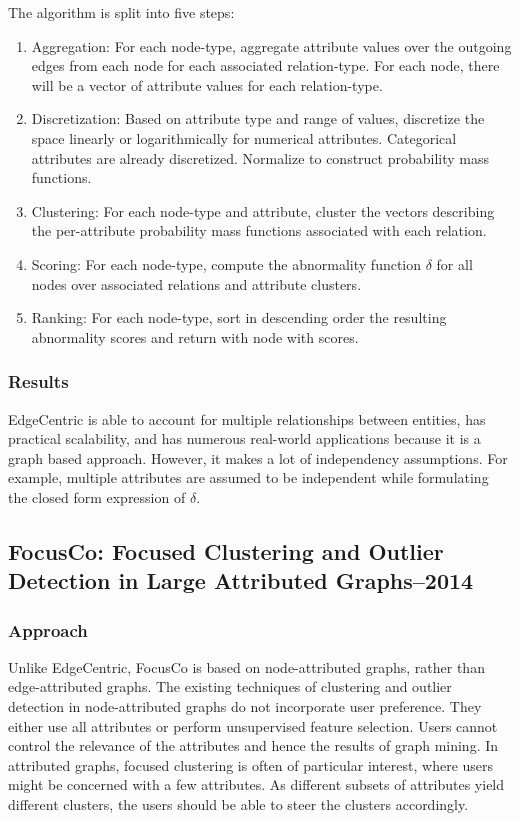 \documentclass[11pt, oneside]{article}   	%
\begin{document}
\quad The algorithm is split into five steps:
\begin{enumerate}
\item Aggregation: For each node-type, aggregate attribute values over the outgoing edges from each node for each associated relation-type.
For each node, there will be a vector of attribute values for each relation-type.
\item Discretization: Based on attribute type and range of values, discretize the space linearly or logarithmically for numerical attributes.
Categorical attributes are already discretized.
Normalize to construct probability mass functions.
\item Clustering: For each node-type and attribute, cluster the vectors describing the per-attribute probability mass functions associated with each relation.
\item Scoring: For each node-type, compute the abnormality function $\delta$ for all nodes over associated relations and attribute clusters.
\item Ranking: For each node-type, sort in descending order the resulting abnormality scores and return with node with scores.
\end{enumerate}

\subsubsection*{Results}

\quad EdgeCentric is able to account for multiple relationships between entities, has practical scalability, and has numerous real-world applications because it is a graph based approach.
However, it makes a lot of independency assumptions.
For example, multiple attributes are assumed to be independent while formulating the closed form expression of $\delta$. 


\subsection*{FocusCo: Focused Clustering and Outlier Detection in Large Attributed Graphs--2014}

\subsubsection*{Approach}

\quad Unlike EdgeCentric, FocusCo is based on node-attributed graphs, rather than edge-attributed graphs.
The existing techniques of clustering and outlier detection in node-attributed graphs do not incorporate user preference.
They either use all attributes or perform unsupervised feature selection.
Users cannot control the relevance of the attributes and hence the results of graph mining. %
In attributed graphs, focused clustering is often of particular interest, where users might be concerned with a few attributes. 
As different subsets of attributes yield different clusters, the users should be able to steer the clusters accordingly.
\end{document}
